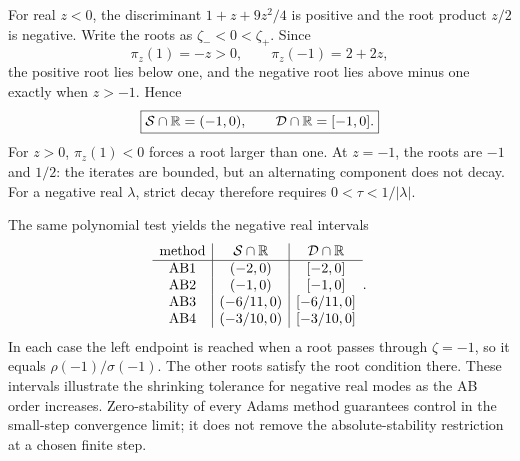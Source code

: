 For real \(z<0\), the discriminant
\(1+z+9z^2/4\) is positive and the root product \(z/2\) is
negative. Write the roots as \(\zeta_-<0<\zeta_+\).
Since
\[
 \pi_z(1)=-z>0,\qquad \pi_z(-1)=2+2z,
\]
the positive root lies below one, and the negative root lies above
minus one exactly when \(z>-1\). Hence
\begin{equation}\label{eq:ab2-real-interval-oct-09}
 \boxed{\mathcal S\cap\mathbb{R}=(-1,0),\qquad
        \mathcal D\cap\mathbb{R}=[-1,0].}
\end{equation}
For \(z>0\), \(\pi_z(1)<0\) forces a root larger than one.
At \(z=-1\), the roots are \(-1\) and \(1/2\): the iterates
are bounded, but an alternating component does not decay.
For a negative real \(\lambda\), strict decay therefore requires
\(0<\tau<1/|\lambda|\).

The same polynomial test yields the negative real intervals
\[
 \begin{array}{c|c|c}
  \text{method}&\mathcal S\cap\mathbb{R}&\mathcal D\cap\mathbb{R}\\ \hline
  \text{AB1}&(-2,0)&[-2,0]\\
  \text{AB2}&(-1,0)&[-1,0]\\
  \text{AB3}&(-6/11,0)&[-6/11,0]\\
  \text{AB4}&(-3/10,0)&[-3/10,0]
 \end{array}.
\]
In each case the left endpoint is reached when a root passes through
\(\zeta=-1\), so it equals \(\rho(-1)/\sigma(-1)\).
The other roots satisfy the root condition there. These intervals
illustrate the shrinking tolerance for negative real modes as the
AB order increases. Zero-stability of every Adams method guarantees
control in the small-step convergence limit; it does not remove
the absolute-stability restriction at a chosen finite step.

